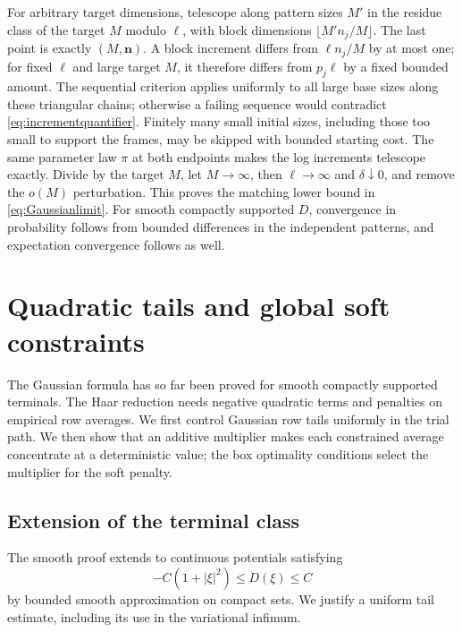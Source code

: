 \documentclass[11pt]{article}
\numberwithin{equation}{section}
\theoremstyle{definition}
\begin{document}
For arbitrary target dimensions, telescope along pattern sizes $M'$ in the residue class of the target $M$ modulo $\ell$, with block dimensions $\lfloor M'n_j/M\rfloor$. The last point is exactly $(M,\boldsymbol n)$. A block increment differs from $\ell n_j/M$ by at most one; for fixed $\ell$ and large target $M$, it therefore differs from $p_j\ell$ by a fixed bounded amount. The sequential criterion applies uniformly to all large base sizes along these triangular chains; otherwise a failing sequence would contradict \eqref{eq:incrementquantifier}. Finitely many small initial sizes, including those too small to support the frames, may be skipped with bounded starting cost. The same parameter law $\pi$ at both endpoints makes the log increments telescope exactly. Divide by the target $M$, let $M\to\infty$, then $\ell\to\infty$ and $\delta\downarrow0$, and remove the $o(M)$ perturbation. This proves the matching lower bound in \eqref{eq:Gaussianlimit}. For smooth compactly supported $D$, convergence in probability follows from bounded differences in the independent patterns, and expectation convergence follows as well.

\section{Quadratic tails and global soft constraints}
\label{sec:penalty}
The Gaussian formula has so far been proved for smooth compactly supported terminals. The Haar reduction needs negative quadratic terms and penalties on empirical row averages. We first control Gaussian row tails uniformly in the trial path. We then show that an additive multiplier makes each constrained average concentrate at a deterministic value; the box optimality conditions select the multiplier for the soft penalty.

\subsection{Extension of the terminal class}
The smooth proof extends to continuous potentials satisfying
\begin{equation}\label{eq:terminalgrowth}
-C(1+|\xi|^2)\le D(\xi)\le C
\end{equation}
by bounded smooth approximation on compact sets. We justify a uniform tail estimate, including its use in the variational infimum.
\end{document}
